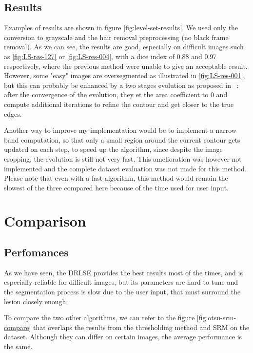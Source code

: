 \documentclass[a4paper,10pt]{article}
\begin{document}
\subsection{Results}
Examples of results are shown in figure \ref{fig:level-set-results}. We used only the conversion to grayscale and the hair removal preprocessing (no black frame removal). As we can see, the results are good, especially on difficult images such as \ref{fig:LS-res-127} or \ref{fig:LS-res-004}, with a dice index of 0.88 and 0.97 respectively, where the previous method were unable to give an acceptable result. However, some "easy" images are oversegmented as illustrated in \ref{fig:LS-res-001}, but this can probably be enhanced by a two stages evolution as proposed in~\cite{li2010distance} : after the convergence of the evolution, they et the area coefficient to 0 and compute additional iterations to refine the contour and get closer to the true edges. 

Another way to improve my implementation would be to implement a narrow band computation, so that only a small region around the current contour gets updated on each step, to speed up the algorithm, since despite the image cropping, the evolution is still not very fast. This amelioration was however not implemented and the complete dataset evaluation was not made for this method. Please note that even with a fast algorithm, this method would remain the slowest of the three compared here because of the time used for user input. 

\section{Comparison}

\subsection{Perfomances}

As we have seen, the DRLSE provides the best results most of the times, and is especially reliable for difficult images, but its parameters are hard to tune and the segmentation process is slow due to the user input, that must surround the lesion closely enough.

To compare the two other algorithms, we can refer to the figure \ref{fig:otsu-srm-compare} that overlaps the results from the thresholding method and SRM on the dataset. Although they can differ on certain images, the average performance is the same.
\end{document}
